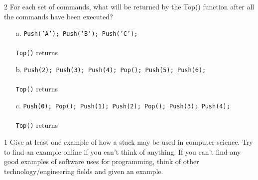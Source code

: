 \documentclass[a4paper,12pt,oneside]{book}
\newcounter{question}
\begin{document}
        \newpage
        \begin{question}{\thequestion}{2}
            For each set of commands, what will be returned by the Top()
            function after all the commands have been executed?

            \begin{itemize}
                \item[a.]   \texttt{Push('A'); Push('B'); Push('C');}
                    ~\\~\\
                    \texttt{Top()} returns 
                ~\\
                \item[b.]   \texttt{Push(2); Push(3); Push(4); Pop(); Push(5); Push(6);}
                    ~\\~\\
                    \texttt{Top()} returns 
                ~\\
                \item[c.]   \texttt{Push(0); Pop(); Push(1); Push(2); Pop(); Push(3); Push(4);}
                    ~\\~\\
                    \texttt{Top()} returns 
            \end{itemize}
        \end{question}

        \hrulefill
        \begin{question}{\thequestion}{1}
            Give at least one example of how a stack may be used in computer science.
            Try to find an example online if you can't think of anything.
            If you can't find any good examples of software uses for programming,
            think of other technology/engineering fields and given an example.
        \end{question}

        
\end{document}
